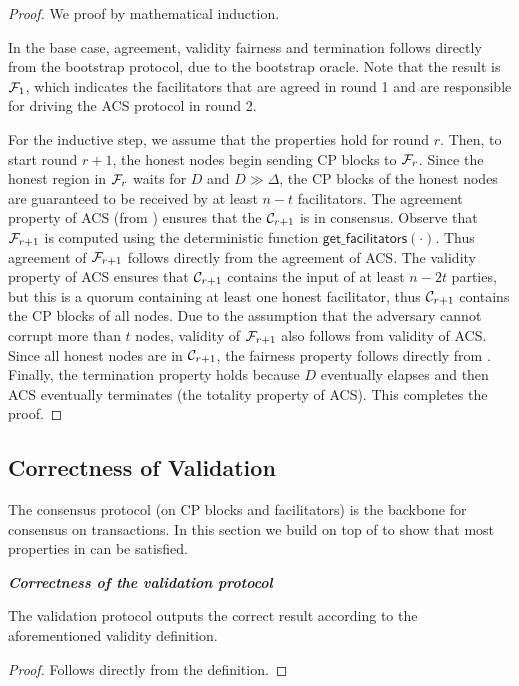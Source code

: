 \begin{proof}
We proof by mathematical induction.

In the base case, agreement, validity fairness and termination follows directly from the bootstrap protocol, due to the bootstrap oracle.
Note that the result is $\mathcal{F}_1$, which indicates the facilitators that are agreed in round 1 and are responsible for driving the ACS protocol in round 2.

For the inductive step, we assume that the properties hold for round $r$.
Then, to start round $r + 1$, the honest nodes begin sending CP blocks to $\mathcal{F}_r$. %
Since the honest region in $\mathcal{F}_r$ waits for $D$ and $D \gg \Delta$,
the CP blocks of the honest nodes are guaranteed to be received by at least $n - t$ facilitators.
The agreement property of ACS (from ) ensures that the $\mathcal{C}_{r + 1}$ is in consensus. 
Observe that $\mathcal{F}_{r + 1}$ is computed using the deterministic function $\textsf{get\_facilitators}(\cdot)$.
Thus agreement of $\mathcal{F}_{r + 1}$ follows directly from the agreement of ACS.
The validity property of ACS ensures that $\mathcal{C}_{r + 1}$ contains the input of at least $n - 2t$ parties, but this is a quorum containing at least one honest facilitator,
thus $\mathcal{C}_{r + 1}$ contains the CP blocks of all nodes.
Due to the assumption that the adversary cannot corrupt more than $t$ nodes,
validity of $\mathcal{F}_{r + 1}$ also follows from validity of ACS.
Since all honest nodes are in $\mathcal{C}_{r + 1}$, the fairness property follows directly from .
Finally, the termination property holds because $D$ eventually elapses and then ACS eventually terminates
(the totality property of ACS).
This completes the proof.
\end{proof}

\subsection{Correctness of Validation}
The consensus protocol (on CP blocks and facilitators) is the backbone for consensus on transactions.
In this section we build on top of  to show that most properties in  can be satisfied.

\begin{lemma}
\textbf{\emph{Correctness of the validation protocol}}

The validation protocol outputs the correct result
according to the aforementioned validity definition.
\end{lemma}
\begin{proof}
Follows directly from the definition.
\end{proof}

